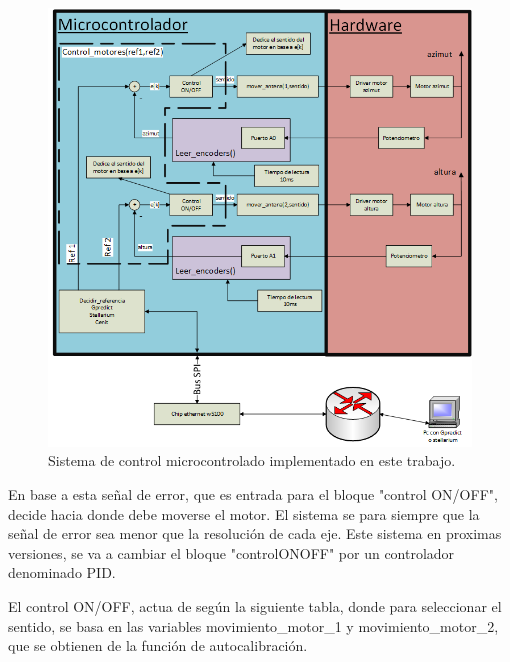 \begin{figure}[pt]
	\hspace{-30mm}
	\includegraphics{control_realimentado}
	\caption{Sistema de control microcontrolado implementado en este trabajo.}
	\label{fig:sist_control_real}
\end{figure}

 En base a esta señal de error, que es entrada para el bloque "control ON/OFF", decide hacia donde debe moverse el motor. El sistema se para siempre que la señal de error sea menor que la resolución de cada eje. Este sistema en proximas versiones, se va a cambiar el bloque "controlONOFF" por un controlador denominado PID. 

 El control ON/OFF, actua de según la siguiente tabla, donde para seleccionar el sentido, se basa en las variables movimiento\_motor\_1 y movimiento\_motor\_2, que se obtienen de la función de autocalibración. 
 
